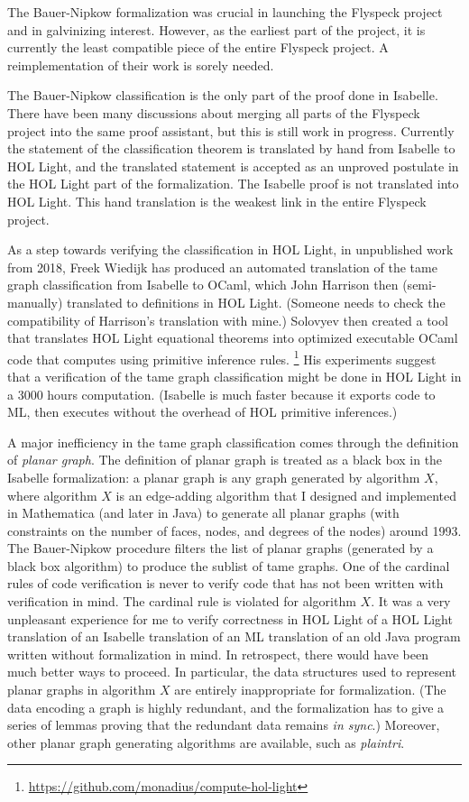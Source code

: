 \documentclass{amsart}
\begin{document}
The Bauer-Nipkow formalization was crucial in launching the Flyspeck
project and in galvinizing interest.  However, as the earliest part of
the project, it is currently the least compatible piece of the entire
Flyspeck project.  A reimplementation of their work is sorely needed.

The Bauer-Nipkow classification is the only part of the proof done in
Isabelle.  There have been many discussions about merging all parts of
the Flyspeck project into the same proof assistant, but this is still
work in progress.  Currently the statement of the classification
theorem is translated by hand from Isabelle to HOL Light, and the
translated statement is accepted as an unproved postulate in the HOL
Light part of the formalization.  The Isabelle proof is not translated
into HOL Light.  This hand translation is the weakest link in the
entire Flyspeck project.

As a step towards verifying the classification in HOL Light, in
unpublished work from 2018, Freek Wiedijk has produced an automated
translation of the tame graph classification from Isabelle to OCaml,
which John Harrison then (semi-manually) translated to definitions in HOL Light.
(Someone needs to check the compatibility of Harrison's translation with mine.)
Solovyev then created a tool that translates HOL Light equational theorems
into optimized executable OCaml code that computes using primitive inference rules.%
\footnote{\url{https://github.com/monadius/compute-hol-light}} His
experiments suggest that a verification of the tame graph
classification might be done in HOL Light in a 3000 hours computation.
(Isabelle is much faster because it exports code to ML, then executes
without the overhead of HOL primitive inferences.)

A major inefficiency in the tame graph classification comes through
the definition of \emph{planar graph}.  The definition of planar graph
is treated as a black box in the Isabelle formalization: a planar
graph is any graph generated by algorithm $X$, where algorithm $X$ is
an edge-adding algorithm that I designed and implemented in
Mathematica (and later in Java) to generate all planar graphs (with
constraints on the number of faces, nodes, and degrees of the nodes)
around 1993.  The Bauer-Nipkow procedure filters the list of planar
graphs (generated by a black box algorithm) to produce the sublist of
tame graphs.  One of the cardinal rules of code verification is never
to verify code that has not been written with verification in mind.
The cardinal rule is violated for algorithm $X$.  It was a very
unpleasant experience for me to verify correctness in HOL Light of a
HOL Light translation of an Isabelle translation of an ML translation
of an old Java program written without formalization in mind.  In
retrospect, there would have been much better ways to proceed.  In
particular, the data structures used to represent planar graphs in
algorithm $X$ are entirely inappropriate for formalization.  (The data
encoding a graph is highly redundant, and the formalization has to
give a series of lemmas proving that the redundant data remains
\emph{in sync}.)  Moreover, other planar graph generating algorithms
are available, such as \emph{plaintri}.
\end{document}
